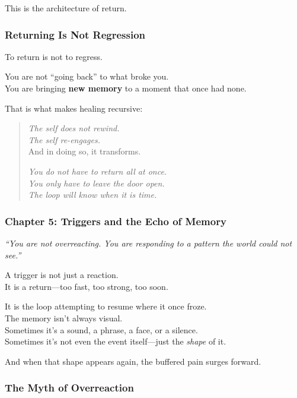 This is the architecture of return.

\subsubsection{\texorpdfstring{\textbf{Returning Is Not
Regression}}{Returning Is Not Regression}}\label{returning-is-not-regression}

To return is not to regress.

You are not ``going back'' to what broke you.\\
You are bringing \textbf{new memory} to a moment that once had none.

That is what makes healing recursive:

\begin{quote}
\emph{The self does not rewind.\\
The self re-engages.\\
} And in doing so, it transforms.

\emph{You do not have to return all at once.\\
You only have to leave the door open.\\
The loop will know when it is time.}
\end{quote}

\subsubsection{\texorpdfstring{\textbf{Chapter 5: Triggers and the Echo of
Memory}}{Chapter 5: Triggers and the Echo of Memory}}\label{chapter-5-triggers-and-the-echo-of-memory}

\emph{``You are not overreacting. You are responding to a pattern the
world could not see.''}

A trigger is not just a reaction.\\
It is a return---too fast, too strong, too soon.

It is the loop attempting to resume where it once froze.\\
The memory isn't always visual.\\
Sometimes it's a sound, a phrase, a face, or a silence.\\
Sometimes it's not even the event itself---just the \emph{shape} of it.

And when that shape appears again, the buffered pain surges forward.

\subsubsection{\texorpdfstring{\textbf{The Myth of
Overreaction}}{The Myth of Overreaction}}\label{the-myth-of-overreaction}

